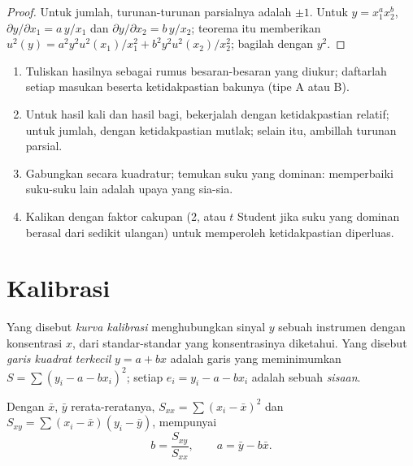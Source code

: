 \begin{proof}
Untuk jumlah, turunan-turunan parsialnya adalah $\pm1$. Untuk $y = x_1^ax_2^b$, $\partial y/\partial x_1 =
a\,y/x_1$ dan $\partial y/\partial x_2 = b\,y/x_2$; teorema itu memberikan $u^2(y) = a^2y^2u^2(x_1)/x_1^2 +
b^2y^2u^2(x_2)/x_2^2$; bagilah dengan $y^2$.
\end{proof}

\begin{method}\label{met:b2:measurement-statistics:propagate}
\begin{enumerate}
  \item Tuliskan hasilnya sebagai rumus besaran-besaran yang diukur;
        daftarlah setiap masukan beserta ketidakpastian bakunya (tipe A atau B).
  \item Untuk hasil kali dan hasil bagi, bekerjalah dengan ketidakpastian
        relatif; untuk jumlah, dengan ketidakpastian mutlak; selain itu,
        ambillah turunan parsial.
  \item Gabungkan secara kuadratur; temukan suku yang dominan: memperbaiki
        suku-suku lain adalah upaya yang sia-sia.
  \item Kalikan dengan faktor cakupan (2, atau $t$ Student jika suku yang
        dominan berasal dari sedikit ulangan) untuk memperoleh
        ketidakpastian diperluas.
\end{enumerate}
\end{method}

\section{Kalibrasi}

\begin{definition}\label{def:b2:measurement-statistics:calibration}
Yang disebut \emph{kurva kalibrasi} menghubungkan
sinyal $y$ sebuah instrumen dengan
konsentrasi $x$, dari standar-standar yang konsentrasinya diketahui. Yang
disebut \emph{garis kuadrat
terkecil} $y = a + bx$ adalah garis yang meminimumkan $S = \sum (y_i - a -
bx_i)^2$; setiap $e_i = y_i - a - bx_i$ adalah sebuah \emph{sisaan}.
\end{definition}

\begin{theorem}\label{thm:b2:measurement-statistics:least-squares}
Dengan $\bar x$, $\bar y$ rerata-reratanya, $S_{xx} = \sum(x_i - \bar x)^2$ dan $S_{xy} = \sum(x_i - \bar x)(y_i -
\bar y)$,  mempunyai
\begin{equation*}
b = \frac{S_{xy}}{S_{xx}}, \qquad a = \bar y - b\bar x.
\end{equation*}
\end{theorem}

